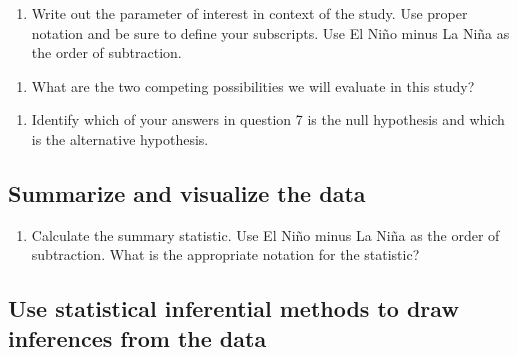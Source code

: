 \documentclass[
]{report}
\providecommand{\tightlist}{%
  \setlength{\itemsep}{0pt}\setlength{\parskip}{0pt}}
\begin{document}
\begin{enumerate}
\def\labelenumi{\arabic{enumi}.}
\setcounter{enumi}{5}
\tightlist
\item
  Write out the parameter of interest in context of the study. Use proper notation and be sure to define your subscripts. Use El Ni\~{n}o minus La Ni\~{n}a as the order of subtraction.
\end{enumerate}

\vspace{1in}

\begin{enumerate}
\def\labelenumi{\arabic{enumi}.}
\setcounter{enumi}{6}
\tightlist
\item
  What are the two competing possibilities we will evaluate in this study?
\end{enumerate}

\vspace{1in}

\begin{enumerate}
\def\labelenumi{\arabic{enumi}.}
\setcounter{enumi}{7}
\tightlist
\item
  Identify which of your answers in question 7 is the null hypothesis and which is the alternative hypothesis.
\end{enumerate}

\vspace{1in}

\hypertarget{summarize-and-visualize-the-data}{%
\subsection{Summarize and visualize the data}\label{summarize-and-visualize-the-data}}

\begin{enumerate}
\def\labelenumi{\arabic{enumi}.}
\setcounter{enumi}{8}
\tightlist
\item
  Calculate the summary statistic. Use El Ni\~{n}o minus La Ni\~{n}a as the order of subtraction. What is the appropriate notation for the statistic?
\end{enumerate}

\vspace{0.5in}

\hypertarget{use-statistical-inferential-methods-to-draw-inferences-from-the-data}{%
\subsection{Use statistical inferential methods to draw inferences from the data}\label{use-statistical-inferential-methods-to-draw-inferences-from-the-data}}
\end{document}

